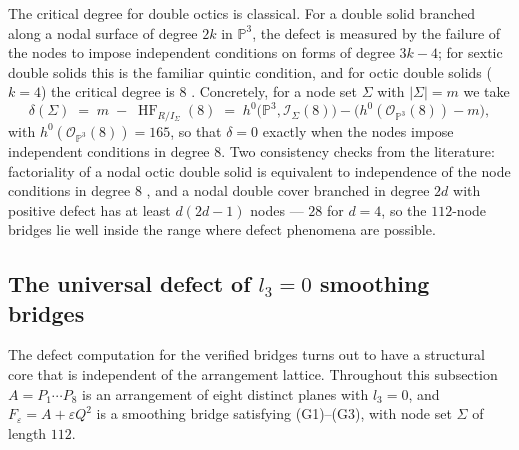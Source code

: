 
The critical degree for double octics is classical. For a double solid
branched along a nodal surface of degree $2k$ in $\mathbb{P}^3$, the defect
is measured by the failure of the nodes to impose independent conditions on
forms of degree $3k - 4$; for sextic double solids this is the familiar
quintic condition, and for octic double solids ($k = 4$) the critical
degree is $8$ \cite{Clemens83, CynkNodalOctics, Cheltsov, KloostermanDefect}.
Concretely, for a node set $\Sigma$ with $|\Sigma| = m$ we take
\[
  \delta(\Sigma)
  \;=\; m \;-\; \operatorname{HF}_{R/I_\Sigma}(8)
  \;=\; h^0\!\bigl(\mathbb{P}^3, \mathcal{I}_\Sigma(8)\bigr)
        - \bigl( h^0(\mathcal{O}_{\mathbb{P}^3}(8)) - m \bigr),
\]
with $h^0(\mathcal{O}_{\mathbb{P}^3}(8)) = 165$, so that $\delta = 0$ exactly
when the nodes impose independent conditions in degree $8$. Two consistency
checks from the literature: factoriality of a nodal octic double solid is
equivalent to independence of the node conditions in degree $8$
\cite{Cheltsov}, and a nodal double cover branched in degree $2d$ with
positive defect has at least $d(2d-1)$ nodes \cite{KloostermanDefect} ---
$28$ for $d = 4$, so the $112$-node bridges lie well inside the range where
defect phenomena are possible.


\subsection{The universal defect of $l_3 = 0$ smoothing bridges}
\label{sec:universal-defect}

The defect computation for the verified bridges turns out to have a
structural core that is independent of the arrangement lattice. Throughout
this subsection $A = P_1 \cdots P_8$ is an arrangement of eight distinct
planes with $l_3 = 0$, and $F_\varepsilon = A + \varepsilon Q^2$ is a
smoothing bridge satisfying (G1)--(G3), with node set $\Sigma$ of length
$112$.

